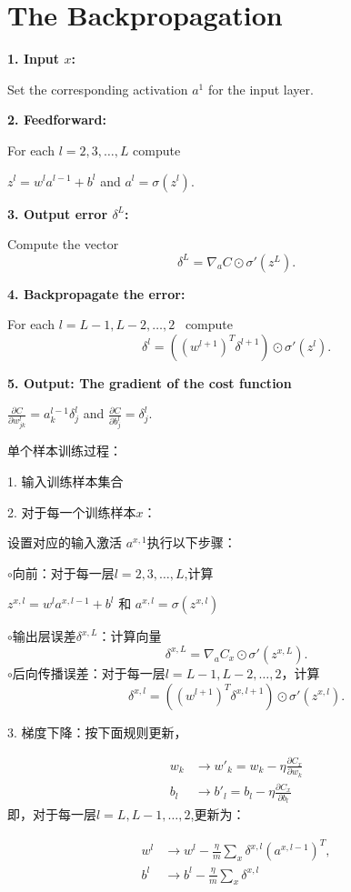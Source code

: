\section{The Backpropagation}
\begin{framed}
\textbf{1. Input $x$:} \par \indent \indent \indent 
Set the corresponding activation $a^{1}$ for the input layer.

\textbf{2. Feedforward:} \par \indent \indent \indent 
For each $l = 2, 3, \ldots, L$ compute \par
\centerline{$z^{l} = w^l a^{l-­1}+b^l$ and $a^{l} = \sigma(z^{l})$.}

\textbf{3. Output error $\delta^L$:} \par \indent \indent \indent 
Compute the vector 
\[ \delta^{L} = \nabla_a C \odot \sigma'(z^L) . \]

\textbf{4. Backpropagate the error:} \par \indent \indent \indent 
For each $l = L-1,L-­2,\ldots, 2$ \ compute 
\[ \delta^{l} = ((w^{l+1})^T \delta^{l+1}) \odot \sigma'(z^{l}).\] \par

\textbf{5. Output: The gradient of the cost function}\par 
\centerline{$\frac{\partial C}{\partial w^l_{jk}} = 
a^{l-­1}_k \delta^l_j$ and $\frac{\partial C}{\partial b^l_j} = \delta^l_j$.}
\end{framed}

单个样本训练过程：
\begin{framed}
1. 输入训练样本集合 

2. 对于每一个训练样本$x$： \par
\indent \indent 设置对应的输入激活 $a^{x,1}$执行以下步骤：\par
\indent \indent $\circ$向前：对于每一层$l = 2, 3, \ldots, L$,计算 \par
\centerline{$z^{x,l} =w^l a^{x,l-­1}+b^l$ 和 $a^{x,l} = \sigma(z^{x,l})$}
\indent \indent $\circ$输出层误差$\delta^{x,L}$：计算向量
\[ \delta^{x,L} = \nabla_a C_x \odot \sigma'(z^{x,L}).\] 
\indent \indent $\circ$后向传播误差：对于每一层$l = L-­1,L-­2,\ldots, 2$，计算
\[ \delta^{x,l} = ((w^{l+1})^T \delta^{x,l+1}) \odot \sigma'(z^{x,l}).\]

3. 梯度下降：按下面规则更新，\par
\begin{align}
w_k & \longrightarrow w'_k = w_k - \eta \frac{\partial C_x}{\partial w_k} \\
b_l & \longrightarrow b'_l = b_l - \eta \frac{\partial C_x}{\partial b_l}
\end{align}
即，对于每一层$l = L, L-­1, \ldots, 2$,更新为： \par
\begin{align}
w^l & \rightarrow w^l­ -\frac{\eta}{m} \sum_x\delta^{x,l} (a^{x,l-­1})^T,\\ 
b^l & \rightarrow b^l­ -\frac{\eta}{m} \sum_x \delta^{x,l}
\end{align}
\end{framed}


